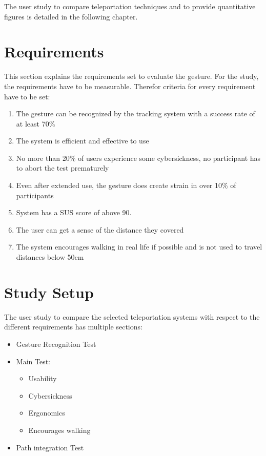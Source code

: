 The user study to compare teleportation techniques and to provide quantitative figures is detailed in the following chapter.


\section{Requirements}
This section explains the requirements set to evaluate the gesture.
For the study, the requirements have to be measurable. Therefor criteria for every requirement have to be set:

\begin{enumerate}
    \item The gesture can be recognized by the tracking system with a success rate of at least 70\%
    \item The system is efficient and effective to use
    \item No more than 20\% of users experience some cybersickness, no participant has to abort the test prematurely
    \item Even after extended use, the gesture does create strain in over 10\% of participants
    \item System has a SUS score of above 90.
    \item The user can get a sense of the distance they covered
    \item The system encourages walking in real life if possible and is not used to travel distances below 50cm
\end{enumerate}


\section{Study Setup}
The user study to compare the selected teleportation systems with respect to the different requirements has multiple sections:
\begin{itemize}
    \item Gesture Recognition Test
    \item Main Test:
    \begin{itemize}
        \item Usability
        \item Cybersickness
        \item Ergonomics
        \item Encourages walking
    \end{itemize}
    \item Path integration Test
\end{itemize}

